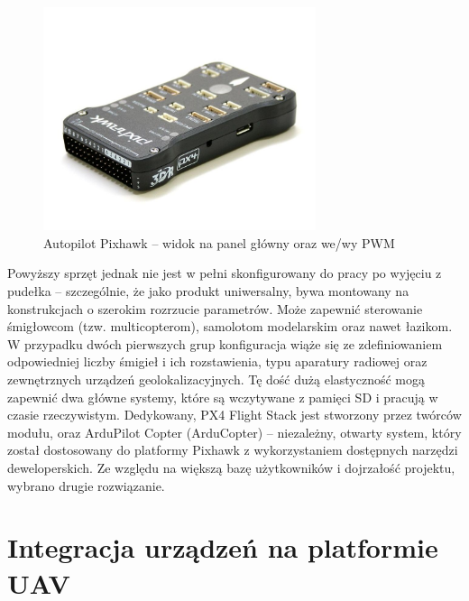 \begin{figure}[h]
	\centering
	\includegraphics[width=8cm]{5_pixhawk.jpg}
	\caption{Autopilot Pixhawk -- widok na panel główny oraz we/wy PWM}
	\label{fig:pixhawk}
\end{figure}

Powyższy sprzęt jednak nie jest w pełni skonfigurowany do pracy po wyjęciu z pudełka -- szczególnie, że jako produkt uniwersalny, bywa montowany na konstrukcjach o szerokim rozrzucie parametrów. 
Może zapewnić sterowanie śmigłowcom (tzw. multicopterom), samolotom modelarskim oraz nawet łazikom. %
W przypadku dwóch pierwszych grup konfiguracja wiąże się ze zdefiniowaniem odpowiedniej liczby śmigieł i ich rozstawienia, typu aparatury radiowej oraz zewnętrznych urządzeń geolokalizacyjnych. 
Tę dość dużą elastyczność mogą zapewnić dwa główne systemy, które są wczytywane z pamięci SD i pracują w czasie rzeczywistym. 
Dedykowany, PX4 Flight Stack jest stworzony przez twórców modułu, oraz ArduPilot Copter (ArduCopter) -- niezależny, otwarty system, który został dostosowany do platformy Pixhawk z wykorzystaniem dostępnych narzędzi deweloperskich. 
Ze względu na większą bazę użytkowników i dojrzałość projektu, wybrano drugie rozwiązanie.

\section{Integracja urządzeń na platformie UAV} %


